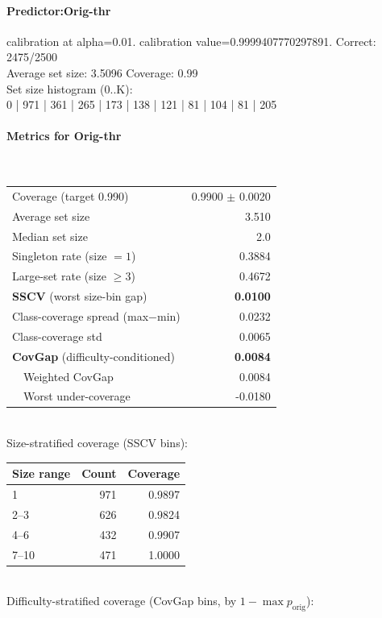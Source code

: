 \documentclass[parskip=half]{scrartcl}
\begin{document}
\paragraph{Predictor:Orig-thr} calibration at alpha=0.01. calibration value=0.9999407770297891. Correct: 2475/2500\\
Average set size: 3.5096   Coverage: 0.99\\
Set size histogram (0..K):\\
0 | 971 | 361 | 265 | 173 | 138 | 121 | 81 | 104 | 81 | 205\\
\paragraph{Metrics for Orig-thr}~\\
\begin{tabular}{l r}
\hline
Coverage (target 0.990) & 0.9900 $\pm$ 0.0020 \\
Average set size & 3.510 \\
Median set size & 2.0 \\
Singleton rate (size $=1$) & 0.3884 \\
Large-set rate (size $\geq 3$) & 0.4672 \\
\textbf{SSCV} (worst size-bin gap) & \textbf{0.0100} \\
Class-coverage spread (max$-$min) & 0.0232 \\
Class-coverage std & 0.0065 \\
\textbf{CovGap} (difficulty-conditioned) & \textbf{0.0084} \\
~~Weighted CovGap & 0.0084 \\
~~Worst under-coverage & -0.0180 \\
\hline
\end{tabular}\\[0.5em]
\textsf{\scriptsize Size-stratified coverage (SSCV bins):}\\
\begin{tabular}{l r r}
\hline
Size range & Count & Coverage \\
\hline
1 & 971 & 0.9897 \\
2--3 & 626 & 0.9824 \\
4--6 & 432 & 0.9907 \\
7--10 & 471 & 1.0000 \\
\hline
\end{tabular}\\[0.5em]
\textsf{\scriptsize Difficulty-stratified coverage (CovGap bins, by $1-\max p_{\mathrm{orig}}$):}\\
\end{document}

